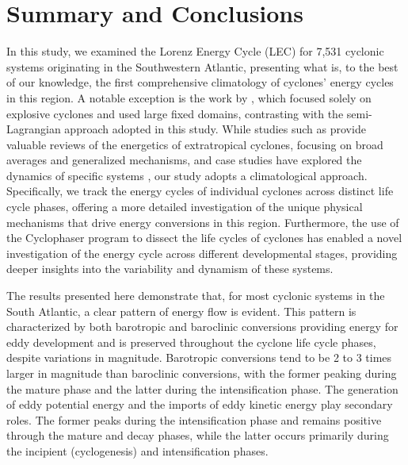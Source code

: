 \documentclass[pdflatex,sn-chicago]{sn-jnl}%
\theoremstyle{plain}
\theoremstyle{definition}
\theoremstyle{remark}
\theoremstyle{definition}
\begin{document}
\section{Summary and Conclusions}\label{sec:conclusion}

In this study, we examined the Lorenz Energy Cycle (LEC) for 7,531 cyclonic systems originating in the Southwestern Atlantic, presenting what is, to the best of our knowledge, the first comprehensive climatology of cyclones' energy cycles in this region. A notable exception is the work by \citet{black2013universal}, which focused solely on explosive cyclones and used large fixed domains, contrasting with the semi-Lagrangian approach adopted in this study. While studies such as \citet{smith1980energetics} provide valuable reviews of the energetics of extratropical cyclones, focusing on broad averages and generalized mechanisms, and case studies have explored the dynamics of specific systems \citep[e.g.]{pezza2014large,dias2011energy,cavicchia2018energetics}, our study adopts a climatological approach. Specifically, we track the energy cycles of individual cyclones across distinct life cycle phases, offering a more detailed investigation of the unique physical mechanisms that drive energy conversions in this region. Furthermore, the use of the Cyclophaser program to dissect the life cycles of cyclones has enabled a novel investigation of the energy cycle across different developmental stages, providing deeper insights into the variability and dynamism of these systems.


The results presented here demonstrate that, for most cyclonic systems in the South Atlantic, a clear pattern of energy flow is evident. This pattern is characterized by both barotropic and baroclinic conversions providing energy for eddy development and is preserved throughout the cyclone life cycle phases, despite variations in magnitude. Barotropic conversions tend to be 2 to 3 times larger in magnitude than baroclinic conversions, with the former peaking during the mature phase and the latter during the intensification phase. The generation of eddy potential energy and the imports of eddy kinetic energy play secondary roles. The former peaks during the intensification phase and remains positive through the mature and decay phases, while the latter occurs primarily during the incipient (cyclogenesis) and intensification phases.
\end{document}
